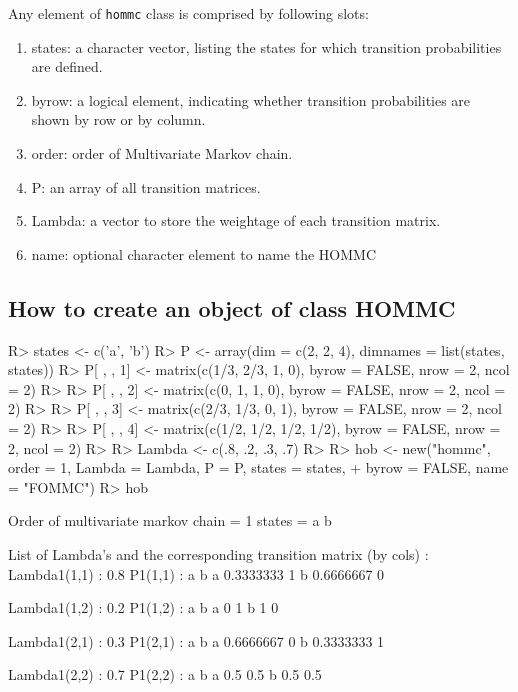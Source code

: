 \documentclass[
  nojss]{jss}
\providecommand{\tightlist}{%
  \setlength{\itemsep}{0pt}\setlength{\parskip}{0pt}}
\begin{document}
Any element of \texttt{hommc} class is comprised by following slots:

\begin{enumerate}
\def\labelenumi{\arabic{enumi}.}
\tightlist
\item
  states: a character vector, listing the states for which transition probabilities are defined.
\item
  byrow: a logical element, indicating whether transition probabilities are shown by row or by column.
\item
  order: order of Multivariate Markov chain.
\item
  P: an array of all transition matrices.
\item
  Lambda: a vector to store the weightage of each transition matrix.
\item
  name: optional character element to name the HOMMC
\end{enumerate}

\hypertarget{how-to-create-an-object-of-class-hommc}{%
\subsection{How to create an object of class HOMMC}\label{how-to-create-an-object-of-class-hommc}}

\begin{CodeChunk}

\begin{CodeInput}
R> states <- c('a', 'b')
R> P <- array(dim = c(2, 2, 4), dimnames = list(states, states))
R> P[ , , 1] <- matrix(c(1/3, 2/3, 1, 0), byrow = FALSE, nrow = 2, ncol = 2)
R> 
R> P[ , , 2] <- matrix(c(0, 1, 1, 0), byrow = FALSE, nrow = 2, ncol = 2)
R> 
R> P[ , , 3] <- matrix(c(2/3, 1/3, 0, 1), byrow = FALSE, nrow = 2, ncol = 2)
R> 
R> P[ , , 4] <- matrix(c(1/2, 1/2, 1/2, 1/2), byrow = FALSE, nrow = 2, ncol = 2)
R> 
R> Lambda <- c(.8, .2, .3, .7)
R> 
R> hob <- new("hommc", order = 1, Lambda = Lambda, P = P, states = states, 
+            byrow = FALSE, name = "FOMMC")
R> hob
\end{CodeInput}

\begin{CodeOutput}
Order of multivariate markov chain = 1 
states = a b 

List of Lambda's and the corresponding transition matrix (by cols) :
Lambda1(1,1) : 0.8
P1(1,1) : 
          a b
a 0.3333333 1
b 0.6666667 0

Lambda1(1,2) : 0.2
P1(1,2) : 
  a b
a 0 1
b 1 0

Lambda1(2,1) : 0.3
P1(2,1) : 
          a b
a 0.6666667 0
b 0.3333333 1

Lambda1(2,2) : 0.7
P1(2,2) : 
    a   b
a 0.5 0.5
b 0.5 0.5
\end{CodeOutput}
\end{CodeChunk}
\end{document}
